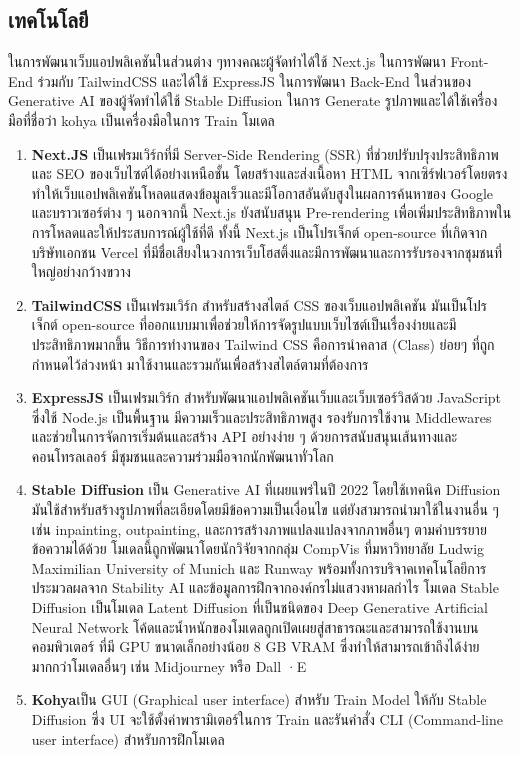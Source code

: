 \documentclass[12pt,oneside,openright,a4paper]{cpe-thai-project}
\begin{document}
\subsection{เทคโนโลยี}
\hspace {18pt}ในการพัฒนาเว็บแอปพลิเคชันในส่วนต่าง ๆทางคณะผู้จัดทำได้ใช้ Next.js ในการพัฒนา Front-End ร่วมกับ TailwindCSS และได้ใช้ ExpressJS ในการพัฒนา Back-End ในส่วนของ Generative AI ของผู้จัดทำได้ใช้ Stable Diffusion ในการ Generate รูปภาพและได้ใช้เครื่องมือที่ชื่อว่า kohya เป็นเครื่องมือในการ Train โมเดล	

\begin{enumerate}

\item \textbf{Next.JS} เป็นเฟรมเวิร์กที่มี Server-Side Rendering (SSR) ที่ช่วยปรับปรุงประสิทธิภาพและ SEO ของเว็บไซต์ได้อย่างเหนือชั้น โดยสร้างและส่งเนื้อหา HTML จากเซิร์ฟเวอร์โดยตรง ทำให้เว็บแอปพลิเคชันโหลดแสดงข้อมูลเร็วและมีโอกาสอันดับสูงในผลการค้นหาของ Google และบราวเซอร์ต่าง ๆ นอกจากนี้ Next.js ยังสนับสนุน Pre-rendering เพื่อเพิ่มประสิทธิภาพในการโหลดและให้ประสบการณ์ผู้ใช้ที่ดี ทั้งนี้ Next.js เป็นโปรเจ็กต์ open-source ที่เกิดจากบริษัทเอกชน Vercel ที่มีชื่อเสียงในวงการเว็บโฮสติ้งและมีการพัฒนาและการรับรองจากชุมชนที่ใหญ่อย่างกว้างขวาง
\item \textbf{TailwindCSS} เป็นเฟรมเวิร์ก สำหรับสร้างสไตล์ CSS ของเว็บแอปพลิเคชัน มันเป็นโปรเจ็กต์ open-source ที่ออกแบบมาเพื่อช่วยให้การจัดรูปแบบเว็บไซต์เป็นเรื่องง่ายและมีประสิทธิภาพมากขึ้น วิธีการทำงานของ Tailwind CSS คือการนำคลาส (Class) ย่อยๆ ที่ถูกกำหนดไว้ล่วงหน้า มาใช้งานและรวมกันเพื่อสร้างสไตล์ตามที่ต้องการ
\item \textbf{ExpressJS} เป็นเฟรมเวิร์ก สำหรับพัฒนาแอปพลิเคชันเว็บและเว็บเซอร์วิสด้วย JavaScript ซึ่งใช้ Node.js เป็นพื้นฐาน มีความเร็วและประสิทธิภาพสูง รองรับการใช้งาน Middlewares และช่วยในการจัดการเริ่มต้นและสร้าง API อย่างง่าย ๆ ด้วยการสนับสนุนเส้นทางและคอนโทรลเลอร์ มีชุมชนและความร่วมมือจากนักพัฒนาทั่วโลก
\item \textbf{Stable Diffusion} เป็น Generative AI ที่เผยแพร่ในปี 2022 โดยใช้เทคนิค Diffusion มันใช้สำหรับสร้างรูปภาพที่ละเอียดโดยมีข้อความเป็นเงื่อนไข แต่ยังสามารถนำมาใช้ในงานอื่น ๆ เช่น inpainting, outpainting, และการสร้างภาพแปลงแปลงจากภาพอื่นๆ ตามคำบรรยายข้อความได้ด้วย โมเดลนี้ถูกพัฒนาโดยนักวิจัยจากกลุ่ม CompVis ที่มหาวิทยาลัย Ludwig Maximilian University of Munich และ Runway พร้อมทั้งการบริจาคเทคโนโลยีการประมวลผลจาก Stability AI และข้อมูลการฝึกจากองค์กรไม่แสวงหาผลกำไร โมเดล Stable Diffusion เป็นโมเดล Latent Diffusion ที่เป็นชนิดของ Deep Generative Artificial Neural Network โค้ดและน้ำหนักของโมเดลถูกเปิดเผยสู่สาธารณะและสามารถใช้งานบนคอมพิวเตอร์ ที่มี GPU ขนาดเล็กอย่างน้อย 8 GB VRAM ซึ่งทำให้สามารถเข้าถึงได้ง่ายมากกว่าโมเดลอื่นๆ เช่น Midjourney หรือ Dall ·E
\item \textbf{Kohya}เป็น GUI (Graphical user interface) สำหรับ Train Model ให้กับ Stable Diffusion ซึ่ง UI จะใช้ตั้งค่าพารามิเตอร์ในการ Train และรันคำสั่ง CLI (Command-line user interface) สำหรับการฝึกโมเดล

\end{enumerate}
\end{document}
